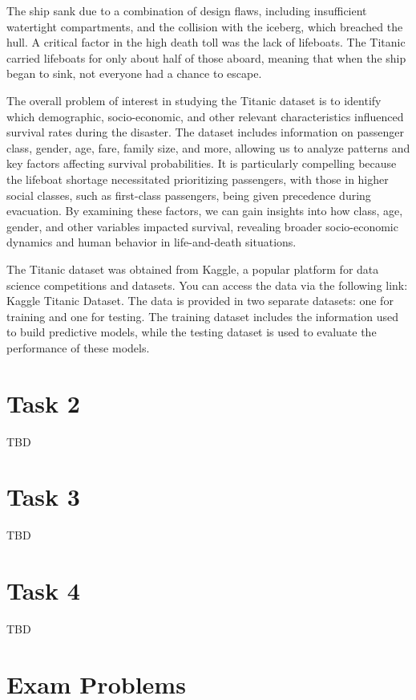 \documentclass[twoside,11pt]{article}
\makeatletter
\let\@oldsection\section
\renewcommand\section[1]{\@oldsection*{#1}}
\makeatother
\begin{document}
The ship sank due to a combination of design flaws, including insufficient watertight compartments, and the collision with the iceberg, which breached the hull. A critical factor in the high death toll was the lack of lifeboats. The Titanic carried lifeboats for only about half of those aboard, meaning that when the ship began to sink, not everyone had a chance to escape.

The overall problem of interest in studying the Titanic dataset is to identify which demographic, socio-economic, and other relevant characteristics influenced survival rates during the disaster. The dataset includes information on passenger class, gender, age, fare, family size, and more, allowing us to analyze patterns and key factors affecting survival probabilities. It is particularly compelling because the lifeboat shortage necessitated prioritizing passengers, with those in higher social classes, such as first-class passengers, being given precedence during evacuation. By examining these factors, we can gain insights into how class, age, gender, and other variables impacted survival, revealing broader socio-economic dynamics and human behavior in life-and-death situations.



The Titanic dataset was obtained from Kaggle, a popular platform for data science competitions and datasets. You can access the data via the following link: Kaggle Titanic Dataset. The data is provided in two separate datasets: one for training and one for testing. The training dataset includes the information used to build predictive models, while the testing dataset is used to evaluate the performance of these models.



\section{Task 2}

TBD

\section{Task 3}

TBD

\section{Task 4}

TBD

\section{Exam Problems}
\end{document}
